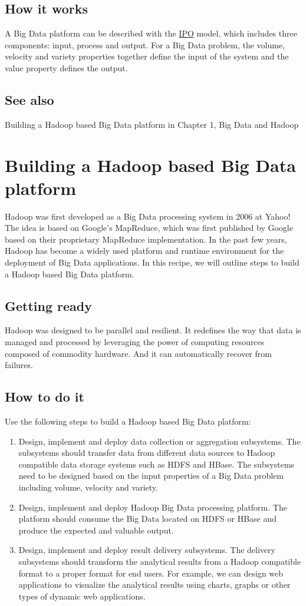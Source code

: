 \subsection*{How it works}
A Big Data platform can be described with the \href{http://en.wikipedia.org/wiki/IPO_Model}{IPO} model, which includes three components: input, process and output. For a Big Data problem, the volume, velocity and variety properties together define the input of the system and the value property defines the output.
\subsection*{See also}
Building a Hadoop based Big Data platform in Chapter 1, Big Data and Hadoop
\section{Building a Hadoop based Big Data platform}
Hadoop was first developed as a Big Data processing system in 2006 at Yahoo! The idea is based on Google's MapReduce, which was first published by Google based on their proprietary MapReduce implementation. In the past few years, Hadoop has become a widely used platform and runtime environment for the deployment of Big Data applications. In this recipe, we will outline steps to build a Hadoop based Big Data platform.
\subsection*{Getting ready}
Hadoop was designed to be parallel and resilient. It redefines the way that data is managed and processed by leveraging the power of computing resources composed of commodity hardware. And it can automatically recover from failures.
\subsection*{How to do it}
Use the following steps to build a Hadoop based Big Data platform:
\begin{enumerate}
  \item Design, implement and deploy data collection or aggregation subsystems. The subsystems should transfer data from different data sources to Hadoop compatible data storage systems such as HDFS and HBase. The subsystems need to be designed based on the input properties of a Big Data problem including volume, velocity and variety.
  \item Design, implement and deploy Hadoop Big Data processing platform. The platform should consume the Big Data located on HDFS or HBase and produce the expected and valuable output.
  \item Design, implement and deploy result delivery subsystems. The delivery subsystems should transform the analytical results from a Hadoop compatible format to a proper format for end users. For example, we can design web applications to visualize the analytical results using charts, graphs or other types of dynamic web applications.
\end{enumerate}
